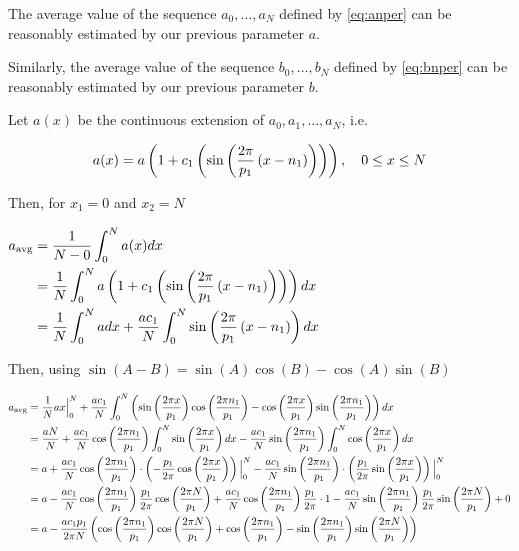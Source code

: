 \begin{prop}\label{thm:avgparam}
The average value of the sequence $a_0,\dots,a_N$ defined by \ref{eq:anper} can be reasonably estimated by our previous parameter $a$.

Similarly, the average value of the sequence $b_0,\dots,b_N$ defined by \ref{eq:bnper} can be reasonably estimated by our previous parameter $b$.

\begin{pf}
Let $a(x)$ be the continuous extension of $a_0,a_1,\dots,a_N$, i.e. 

\begin{equation} \label{eq:axfn}
    a(x)=a\left(1+c_1\left(\sin\left(\frac{2\pi}{p_1}\left(x-n_1\right)\right)\right)\right),\quad 0\leq x \leq N
\end{equation}

Then, for $x_1=0$ and $x_2=N$

$\begin{aligned}
a_{\text{avg}} 
&= \frac{1}{N-0}\int_0^N a(x)dx \\
&= \frac{1}{N}\int_0^N a\left(1+c_1\left(\sin\left(\frac{2\pi}{p_1}\left(x-n_1\right)\right)\right)\right)dx\\
&= \frac1N \int_0^N a dx +  \frac{ac_1}{N} \int_0^N \sin\left(\frac{2\pi}{p_1}\left(x-n_1\right)\right) dx
\end{aligned}$

Then, using  $\sin(A-B) = \sin(A)\cos(B) - \cos(A)\sin(B)$

$\begin{aligned}
a_{\text{avg}} 
&= \frac1N ax\Big|_0^N  + \frac{ac_1}{N} \int_0^N \left(\sin\left(\frac{2\pi x}{p_1}\right)\cos\left(\frac{2\pi n_1}{p_1}\right) - \cos\left(\frac{2\pi x}{p_1}\right)\sin\left(\frac{2\pi n_1}{p_1}\right)\right)dx\\
&= \frac{aN}{N}  
+ \frac{ac_1}{N} \cos\left(\frac{2\pi n_1}{p_1}\right) \int_0^N \sin\left(\frac{2\pi x}{p_1}\right)dx 
-   \frac{ac_1}{N} \sin\left(\frac{2\pi n_1}{p_1}\right) \int_0^N \cos\left(\frac{2\pi x}{p_1}\right)dx\\
&= a 
+  \frac{ac_1}{N} \cos\left(\frac{2\pi n_1}{p_1}\right)  \cdot \left(- \frac{p_1}{2\pi}  \cos\left(\frac{2\pi x}{p_1}\right)\right)\Big|_0^N 
-   \frac{ac_1}{N} \sin\left(\frac{2\pi n_1}{p_1}\right)  \cdot \left( \frac{p_1}{2\pi}  \sin\left(\frac{2\pi x}{p_1}\right)\right)\Big|_0^N \\
&= a 
-\frac{ac_1}{N} \cos\left(\frac{2\pi n_1}{p_1}\right) \frac{p_1}{2\pi} \cos\left(\frac{2\pi N}{p_1}\right) 
+\frac{ac_1}{N}\cos\left(\frac{2\pi n_1}{p_1}\right) \frac{p_1}{2\pi}  \cdot 1
-\frac{ac_1}{N} \sin\left(\frac{2\pi n_1}{p_1}\right) \frac{p_1}{2\pi}  \sin\left(\frac{2\pi N}{p_1}\right)
+0\\
&= a 
-\frac{ac_1 p_1}{2\pi N} \left(\cos\left(\frac{2\pi n_1}{p_1}\right)\cos\left(\frac{2\pi N}{p_1}\right) 
+\cos\left(\frac{2\pi n_1}{p_1}\right) 
-\sin\left(\frac{2\pi n_1}{p_1}\right)  \sin\left(\frac{2\pi N}{p_1}\right)\right)
\end{aligned}$



\end{pf}
\end{prop}
